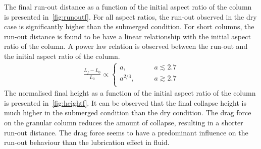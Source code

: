 The final 
run-out distance as a function of the initial aspect ratio of the column is 
presented in~\cref{fig:runoutf}. For all aspect ratios, the run-out observed in 
the dry case is significantly higher than the submerged condition. For short 
columns, the run-out distance is found to be have a linear relationship with 
the initial aspect ratio of the column.  A power law 
relation is observed between the run-out and the initial aspect ratio of the 
column.
%
\begin{align}
\frac{L_{\textit{f}}-L_{\textit{0}}}{L_{\textit{0}}} \propto 
\begin{cases}
a, &\qquad \textit{a}\lesssim 2.7 \\
a^{2/3}, &\qquad \textit{a} \gtrsim 2.7 \\
\end{cases}
\end{align}
%
The normalised final height as a function of the initial aspect ratio 
of the column is presented in~\cref{fig:heightf}. It can be observed that the 
final collapse height is much higher in the submerged condition than the dry 
condition. The drag force on the granular column reduces the amount of 
collapse, resulting in a shorter run-out distance. The drag force seems to have 
a predominant influence on the run-out behaviour than the lubrication effect in 
fluid. 


